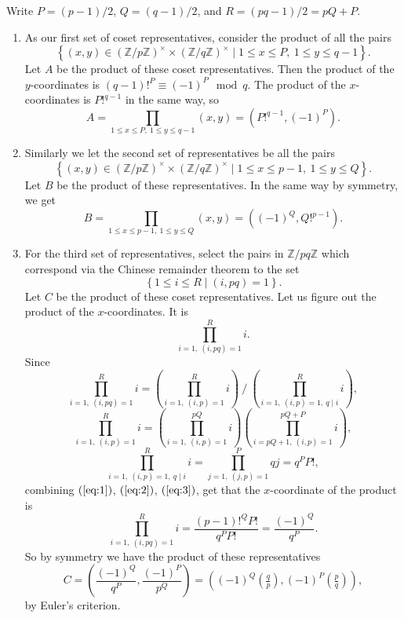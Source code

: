 \documentclass{article}
\newcommand{\Z}{\mathbb{Z}}
\newcommand{\rb}[1]{\left( #1 \right)}
\newcommand{\cb}[1]{\left\{ #1 \right\}}
\newcommand{\unit}[1]{\rb{\Z / #1\Z}^\times}
\newcommand{\legendre}[2]{\rb{\tfrac{#1}{#2}}}
\theoremstyle{definition}\newtheorem{definition}{Definition}
\theoremstyle{definition}\newtheorem{remark}[definition]{Remark}
\theoremstyle{definition}\newtheorem*{example}{Example}
\theoremstyle{definition}\newtheorem*{note}{Note}
\begin{document}
Write $ P = \rb{p - 1} / 2 $, $ Q = \rb{q - 1} / 2 $, and $ R = \rb{pq - 1} / 2 = pQ + P $.
\begin{enumerate}
\item As our first set of coset representatives, consider the product of all the pairs
$$ \cb{\rb{x, y} \in \unit{p} \times \unit{q} \mid 1 \le x \le P, \ 1 \le y \le q - 1}. $$ Let $ A $ be the product of these coset representatives. Then the product of the $ y $-coordinates is $ \rb{q - 1}!^P \equiv \rb{-1}^P \mod q $. The product of the $ x $-coordinates is $ P!^{q - 1} $ in the same way, so
$$ A = \prod_{1 \le x \le P, \ 1 \le y \le q - 1} \rb{x, y} = \rb{P!^{q - 1}, \rb{-1}^P}. $$
\item Similarly we let the second set of representatives be all the pairs
$$ \cb{\rb{x, y} \in \unit{p} \times \unit{q} \mid 1 \le x \le p - 1, \ 1 \le y \le Q}. $$
Let $ B $ be the product of these representatives. In the same way by symmetry, we get
$$ B = \prod_{1 \le x \le p - 1, \ 1 \le y \le Q} \rb{x, y} = \rb{\rb{-1}^Q, Q!^{p - 1}}. $$
\item For the third set of representatives, select the pairs in $ \Z / pq\Z $ which correspond via the Chinese remainder theorem to the set
$$ \cb{1 \le i \le R \mid \rb{i, pq} = 1}. $$
Let $ C $ be the product of these coset representatives. Let us figure out the product of the $ x $-coordinates. It is
$$ \prod_{i = 1, \ \rb{i, pq} = 1}^R i. $$
Since
\begin{equation}
\label{eq:1}
\prod_{i = 1, \ \rb{i, pq} = 1}^R i = \rb{\prod_{i = 1, \ \rb{i, p} = 1}^R i} \ \Bigg/ \ \rb{\prod_{i = 1, \ \rb{i, p} = 1, \ q \mid i}^R i},
\end{equation}
\begin{equation}
\label{eq:2}
\prod_{i = 1, \ \rb{i, p} = 1}^R i = \rb{\prod_{i = 1, \ \rb{i, p} = 1}^{pQ} i}\rb{\prod_{i = pQ + 1, \ \rb{i, p} = 1}^{pQ + P} i},
\end{equation}
\begin{equation}
\label{eq:3}
\prod_{i = 1, \ \rb{i, p} = 1, \ q \mid i}^{R} i = \prod_{j = 1, \ \rb{j, p} = 1}^{P} qj = q^PP!,
\end{equation}
combining $ \rb{\ref{eq:1}} $, $ \rb{\ref{eq:2}} $, $ \rb{\ref{eq:3}} $, get that the $ x $-coordinate of the product is
$$ \prod_{i = 1, \ \rb{i, pq} = 1}^R i = \dfrac{\rb{p - 1}!^QP!}{q^PP!} = \dfrac{\rb{-1}^Q}{q^P}. $$
So by symmetry we have the product of these representatives
$$ C = \rb{\dfrac{\rb{-1}^Q}{q^P}, \dfrac{\rb{-1}^P}{p^Q}} = \rb{\rb{-1}^Q\legendre{q}{p}, \rb{-1}^P\legendre{p}{q}}, $$
by Euler's criterion.
\end{enumerate}
\end{document}
